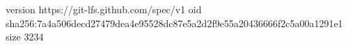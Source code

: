 version https://git-lfs.github.com/spec/v1
oid sha256:7a4a506decd27479dea4e95528dc87e5a2d2f9e55a20436666f2c5a00a1291e1
size 3234
